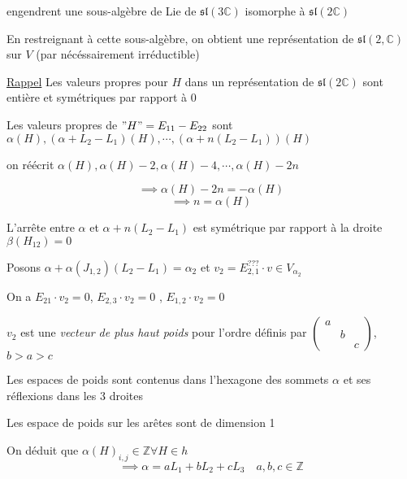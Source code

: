 engendrent une sous-algèbre de Lie de \(\mathfrak{sl}(3 \mathds{C}) \) isomorphe à \(\mathfrak{sl}(2 \mathds{C})\)

En restreignant à cette sous-algèbre, on obtient une représentation de \(\mathfrak{sl}(2,\mathds{C}) \) sur \(V\) (par nécéssairement irréductible) 

\underline{Rappel} 
Les valeurs propres pour \(H\) dans un représentation de \(\mathfrak{sl}(2 \mathds{C})\) sont entière et symétriques par rapport à 0


Les valeurs propres de \("H" = E_{11} - E_{22} \) sont \(\alpha (H) , \left( \alpha + L_2 - L_1  \right) (H), \dotsb, \left( \alpha +n(L_2 - L_1) \right) (H)\)

on réécrit \(\alpha(H), \alpha(H) -2, \alpha(H) -4, \dotsb, \alpha(H) -2n \)

\[ \implies \alpha(H) -2 n = -\alpha (H) \]
\[ \implies n = \alpha(H)  \]

L'arrête entre \(\alpha\) et \(\alpha + n(L_2 - L_1 ) \) est symétrique par rapport à la droite \(\beta(H_{12} ) = 0 \)

Posons \(\alpha + \alpha \left( J_{1,2}  \right) \left( L_2 -L_1  \right) = \alpha_2  \) et \(v_2 = E_{2,1}^{???}\cdot v \in V_{\alpha_2} \)

On a \( E_{21} \cdot v_2 = 0  \), \(E_{2,3} \cdot  v_2 = 0\) , \(E_{1,2} \cdot v_2 =0 \)

\(v_2\) est une \textit{vecteur de plus haut poids} pour l'ordre définis par \(\begin{pmatrix} a\\&b \\ &&c \end{pmatrix} \), \(b>a>c\)

Les espaces de poids sont contenus dans l'hexagone  des sommets \(\alpha \) et ses réflexions dans les 3 droites 

Les espace de poids sur les arêtes sont de dimension 1

On déduit que \(\alpha(H)_{i,j} \in \mathds{Z} \forall H \in h\) 
\[ \implies \alpha = a L_1 + b L_2 + c L_3 \quad a,b,c\in \mathds{Z}\]


